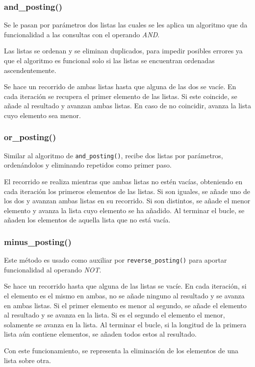 \documentclass[12pt,a4paper]{article}
\begin{document}
\subsubsection{and\_posting()}
Se le pasan por parámetros dos listas las cuales se les aplica un algoritmo que da funcionalidad a las consultas con el operando \textit{AND}.

Las listas se ordenan y se eliminan duplicados, para impedir posibles errores ya que el algoritmo es funcional solo si las listas se encuentran ordenadas ascendentemente.

Se hace un recorrido de ambas listas hasta que alguna de las dos se vacíe. En cada iteración se recupera el primer elemento de las listas. Si este coincide, se añade al resultado y avanzan ambas listas. En caso de no coincidir, avanza la lista cuyo elemento sea menor.

\subsubsection{or\_posting()}
Similar al algoritmo de \texttt{and\_posting()}, recibe dos listas por parámetros, ordenándolos y eliminando repetidos como primer paso.

El recorrido se realiza mientras que ambas listas no estén vacías, obteniendo en cada iteración los primeros elementos de las listas. Si son iguales, se añade uno de los dos y avanzan ambas listas en su recorrido. Si son distintos, se añade el menor elemento y avanza la lista cuyo elemento se ha añadido. Al terminar el bucle, se añaden los elementos de aquella lista que no está vacía.

\subsubsection{minus\_posting()}
Este método es usado como auxiliar por \texttt{reverse\_posting()} para aportar funcionalidad al operando \textit{NOT}.

Se hace un recorrido hasta que alguna de las listas se vacíe. En cada iteración, si el elemento es el mismo en ambas, no se añade ninguno al resultado y se avanza en ambas listas. Si el primer elemento es menor al segundo, se añade el elemento al resultado y se avanza en la lista. Si es el segundo el elemento el menor, solamente se avanza en la lista. Al terminar el bucle, si la longitud de la primera lista aún contiene elementos, se añaden todos estos al resultado.

Con este funcionamiento, se representa la eliminación de los elementos de una lista sobre otra.
\end{document}
